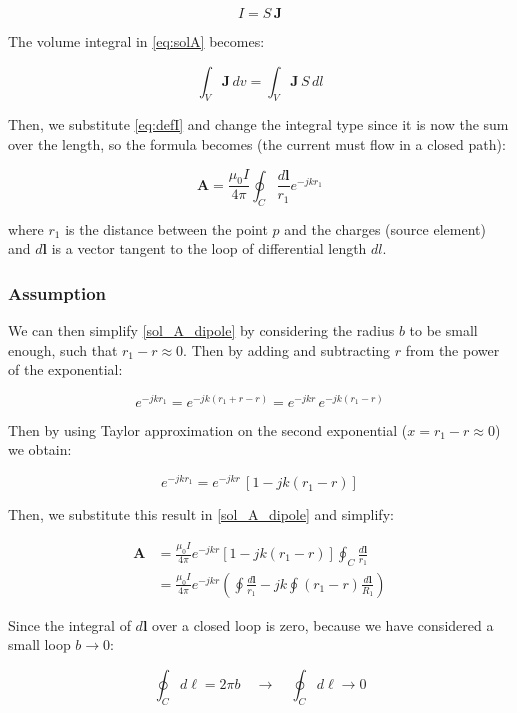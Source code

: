 \[
    I = S \, \mathbf{J}
\]

The volume integral in \ref{eq:solA} becomes:

\[
    \int_V \mathbf{J} \, dv =  \int_V \mathbf{J} \, S \, dl
\]

Then, we substitute \ref{eq:defI} and change the 
integral type since it is now the sum over the length, 
so the formula becomes (the current must flow in a 
closed path):

\begin{equation}
    \mathbf{A} = \frac{\mu_0 I}{4\pi} \oint_C 
    \frac{d\mathbf{l}}{r_1} e^{-j k r_1}
    \label{sol_A_dipole}
\end{equation}

where $r_1$ is the distance between the point $p$ and 
the charges (source element) and $d\mathbf{l}$ is a 
vector tangent to the loop of differential length $dl$.

\subsubsection{Assumption} \label{Assumption}

We can then simplify \ref{sol_A_dipole} by considering 
the radius $b$ to be small enough, such that 
$r_1 - r \approx 0$. Then by adding and subtracting $r$ 
from the power of the exponential:

\[
    e^{-j k r_1} = e^{-j k (r_1 + r - r)} = 
    e^{-j k r} \, e^{-j k (r_1 - r)}
\]

Then by using Taylor approximation on the second 
exponential ($ x = r_1 - r \approx 0$) we obtain:

\[
    e^{-j k r_1} = e^{-j k r}\, \left[ 1 - j k (r_1 - r) \right]
\]

Then, we substitute this result in \ref{sol_A_dipole} 
and simplify:

\[
\begin{aligned}
    \mathbf{A} &= \frac{\mu_0 I}{4 \pi} e^{-j k r} 
    \left[ 1 - j k (r_1 - r) \right] \oint_C 
    \frac{d\mathbf{l}}{r_1} \\
    &= \frac{\mu_0 I}{4 \pi} e^{-j k r} \left( 
    \oint \frac{d\mathbf{l}}{r_1} - j k \oint 
    (r_1 - r) \frac{d\mathbf{l}}{R_1} \right)
\end{aligned}
\]

Since the integral of \(d\mathbf{l}\) over a closed loop 
is zero, because we have considered a small loop $b \to 0$:

\[
    \oint_C d\ell = 2\pi b \quad \rightarrow \quad 
    \oint_C d\ell \rightarrow 0
\]

